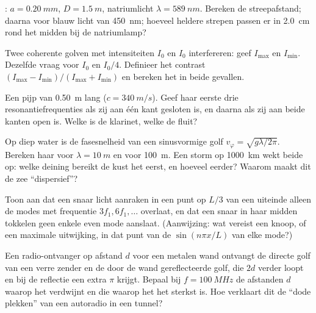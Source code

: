 \begin{exercise}[$\star\star$]\label{exo:b1:wave-propagation:7}
: $a = \qty{0.20}{mm}$, $D = \qty{1.5}{m}$, natriumlicht
$\lambda = \qty{589}{nm}$. Bereken de streepafstand; daarna voor blauw
licht van \qty{450}{nm}; hoeveel heldere strepen passen er in \qty{2.0}{cm}
rond het midden bij de natriumlamp?
\end{exercise}

\begin{exercise}[$\star\star$]\label{exo:b1:wave-propagation:8}
Twee coherente golven met intensiteiten $I_0$ en $I_0$ interfereren: geef
$I_{\max}$ en $I_{\min}$. Dezelfde vraag voor $I_0$ en $I_0/4$. Definieer
het contrast $(I_{\max} - I_{\min})/(I_{\max} + I_{\min})$ en bereken het
in beide gevallen.
\end{exercise}

\begin{exercise}[$\star\star$]\label{exo:b1:wave-propagation:9}
Een pijp van \qty{0.50}{m} lang ($c = \qty{340}{m/s}$). Geef haar eerste drie
resonantiefrequenties als zij aan één kant gesloten is, en daarna als zij aan
beide kanten open is. Welke is de klarinet, welke de fluit?
\end{exercise}

\begin{exercise}[$\star\star\star$]\label{exo:b1:wave-propagation:10}
Op diep water is de fasesnelheid van een sinusvormige golf
$v_\varphi = \sqrt{g\lambda/2\pi}$. Bereken haar voor $\lambda = \qty{10}{m}$
en voor \qty{100}{m}. Een storm op \qty{1000}{km} wekt beide op: welke
deining bereikt de kust het eerst, en hoeveel eerder? Waarom maakt dit de zee
``dispersief''?
\end{exercise}

\begin{exercise}[$\star\star\star$]\label{exo:b1:wave-propagation:11}
Toon aan dat een snaar licht aanraken in een punt op $L/3$ van een uiteinde
alleen de modes met frequentie $3f_1, 6f_1, \dots$ overlaat, en dat een snaar
in haar midden tokkelen geen enkele even mode aanslaat. (Aanwijzing: wat
vereist een knoop, of een maximale uitwijking, in dat punt van de
$\sin(n\pi x/L)$ van elke mode?)
\end{exercise}

\begin{exercise}[$\star\star\star$]\label{exo:b1:wave-propagation:12}
Een radio-ontvanger op afstand $d$ voor een metalen wand ontvangt de directe
golf van een verre zender en de door de wand gereflecteerde golf, die
$2d$ verder loopt en bij de reflectie een extra  $\pi$ krijgt.
Bepaal bij $f = \qty{100}{MHz}$ de afstanden $d$ waarop het
 verdwijnt en die waarop het het sterkst is. Hoe verklaart dit de
``dode plekken'' van een autoradio in een tunnel?
\end{exercise}

